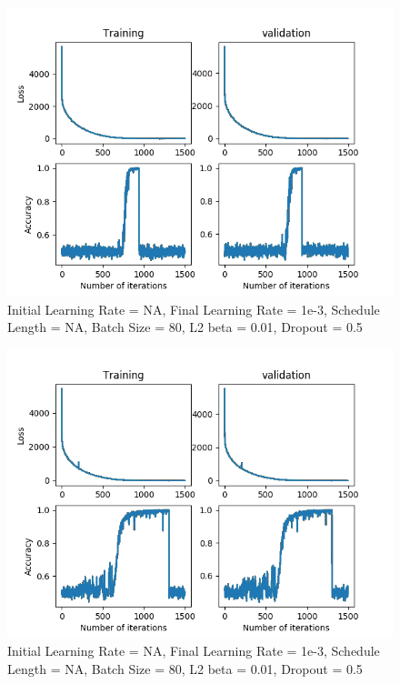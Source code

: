 \documentclass[12pt,reqno]{amsart}
\numberwithin{equation}{section}
\begin{document}
\begin{enumerate}
\begin{figure}[H]
\centering
\includegraphics[scale=0.6]{data_aug3}
\caption{Initial Learning Rate = NA, Final Learning Rate = 1e-3, Schedule Length = NA, Batch Size = 80, L2 beta = 0.01, Dropout = 0.5}
\end{figure}

\begin{figure}[H]
\centering
\includegraphics[scale=0.6]{data_aug4}
\caption{Initial Learning Rate = NA, Final Learning Rate = 1e-3, Schedule Length = NA, Batch Size = 80, L2 beta = 0.01, Dropout = 0.5}
\end{figure}


\end{enumerate}
\end{document}

